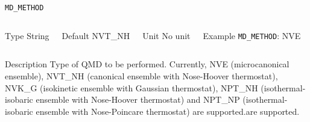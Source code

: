\begin{frame}[allowframebreaks]{\texttt{MD\_METHOD}} \label{MD_METHOD}
\vspace*{-12pt}
\begin{columns}
\begin{block}{Type}
String
\end{block}

\begin{block}{Default}
NVT\_NH
\end{block}

\begin{block}{Unit}
No unit
\end{block}

\begin{block}{Example}
\texttt{MD\_METHOD}: NVE
\end{block}
\end{columns}

\begin{block}{Description}
Type of QMD to be performed. Currently, NVE (microcanonical ensemble), NVT\_NH (canonical ensemble with Nose-Hoover thermostat), NVK\_G (isokinetic ensemble with Gaussian thermostat), NPT\_NH (isothermal-isobaric ensemble with Nose-Hoover thermostat) and NPT\_NP (isothermal-isobaric ensemble with Nose-Poincare thermostat) are supported.are supported.
\end{block}

\end{frame}



